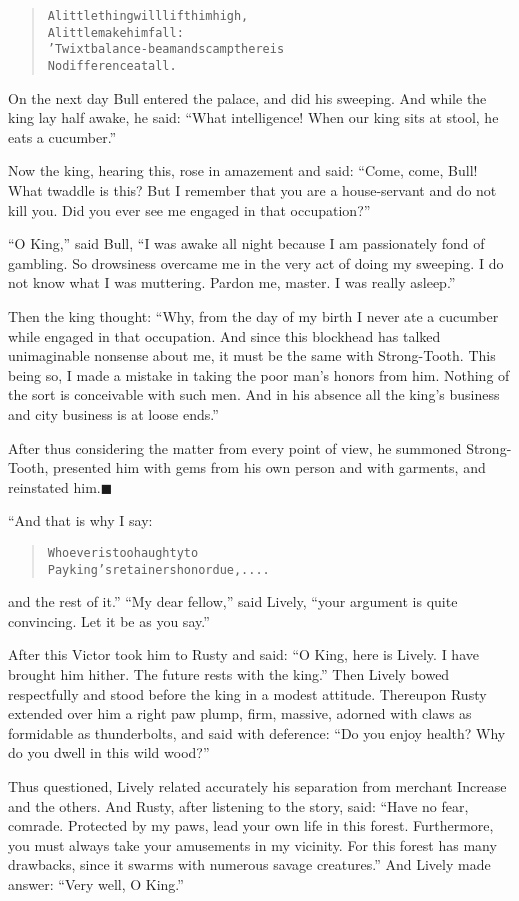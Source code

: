 \documentclass[article, twoside, 14pt]{memoir}
\newcommand{\qed}{\hfill \ensuremath{\blacksquare}}
\renewenvironment{verbatim}{%
\begin{quote}%
\vskip -10pt%
\begin{alltt}\normalfont\large}{\end{alltt}%
\end{quote}%
\vskip -10pt
} %
\begin{document}
\begin{verbatim}
A little thing will lift him high,
    A little make him fall:
'Twixt balance-beam and scamp there is
    No difference at all.
\end{verbatim}
On the next day Bull entered the palace, and did his sweeping. And
while the king lay half awake, he said:
``What intelligence! When our king sits at stool, he eats a cucumber.''

Now the king, hearing this, rose in amazement and said:
``Come, come, Bull! What twaddle is this? But I remember that you are a house-servant and do not kill you. Did you ever see me engaged in that occupation?''

``O King,'' said Bull,
``I was awake all night because I am passionately fond of gambling. So drowsiness overcame me in the very act of doing my sweeping. I do not know what I was muttering. Pardon me, master. I was really asleep.''

Then the king thought:
``Why, from the day of my birth I never ate a cucumber while engaged in that occupation. And since this blockhead has talked unimaginable nonsense about me, it must be the same with Strong-Tooth. This being so, I made a mistake in taking the poor man's honors from him. Nothing of the sort is conceivable with such men. And in his absence all the king's business and city business is at loose ends.''

After thus considering the matter from every point of view, he
summoned Strong-Tooth, presented him with gems from his own person
and with garments, and reinstated him.\hyperref[s4]{\qed}

“And that is why I say:

\begin{verbatim}
Whoever is too haughty to
Pay king's retainers honor due, ....
\end{verbatim}
and the rest of it.” ``My dear fellow,'' said Lively,
``your argument is quite convincing. Let it be as you say.''

After this Victor took him to Rusty and said:
``O King, here is Lively. I have brought him hither. The future rests with the king.''
Then Lively bowed respectfully and stood before the king in a
modest attitude. Thereupon Rusty extended over him a right paw
plump, firm, massive, adorned with claws as formidable as
thunderbolts, and said with deference:
``Do you enjoy health? Why do you dwell in this wild wood?''

Thus questioned, Lively related accurately his separation from
merchant Increase and the others. And Rusty, after listening to the
story, said:
``Have no fear, comrade. Protected by my paws, lead your own life in this forest. Furthermore, you must always take your amusements in my vicinity. For this forest has many drawbacks, since it swarms with numerous savage creatures.''
And Lively made answer: ``Very well, O King.''
\end{document}

